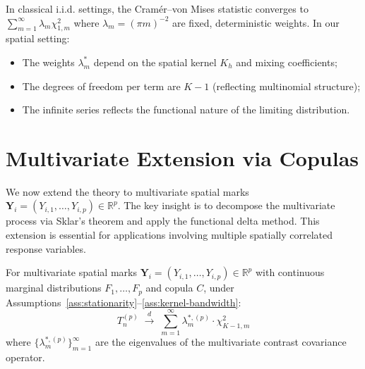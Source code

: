 \begin{remark}
In classical i.i.d. settings, the Cram\'{e}r--von Mises statistic converges to $\sum_{m=1}^{\infty} \lambda_m \chi^2_{1,m}$ where $\lambda_m = (\pi m)^{-2}$ are fixed, deterministic weights. In our spatial setting:
\begin{itemize}
\item The weights $\lambda_m^*$ depend on the spatial kernel $K_h$ and mixing coefficients;
\item The degrees of freedom per term are $K-1$ (reflecting multinomial structure);
\item The infinite series reflects the functional nature of the limiting distribution.
\end{itemize}
\end{remark}



\section{Multivariate Extension via Copulas}
\label{sec:multivariate}

We now extend the theory to multivariate spatial marks $\mathbf{Y}_i = (Y_{i,1}, \ldots, Y_{i,p}) \in \mathbb{R}^p$. The key insight is to decompose the multivariate process via Sklar's theorem and apply the functional delta method. This extension is essential for applications involving multiple spatially correlated response variables.

\begin{theorem}\label{thm:multivariate}
For multivariate spatial marks $\mathbf{Y}_i = (Y_{i,1}, \ldots, Y_{i,p}) \in \mathbb{R}^p$ with continuous marginal distributions $F_1, \ldots, F_p$ and copula $C$, under Assumptions~\ref{ass:stationarity}--\ref{ass:kernel-bandwidth}:
\begin{equation}
T_n^{(p)} \;\xrightarrow{d}\; \sum_{m=1}^{\infty} \lambda_m^{*,(p)} \cdot \chi^2_{K-1,m}
\end{equation}
where $\{\lambda_m^{*,(p)}\}_{m=1}^{\infty}$ are the eigenvalues of the multivariate contrast covariance operator.
\end{theorem}

